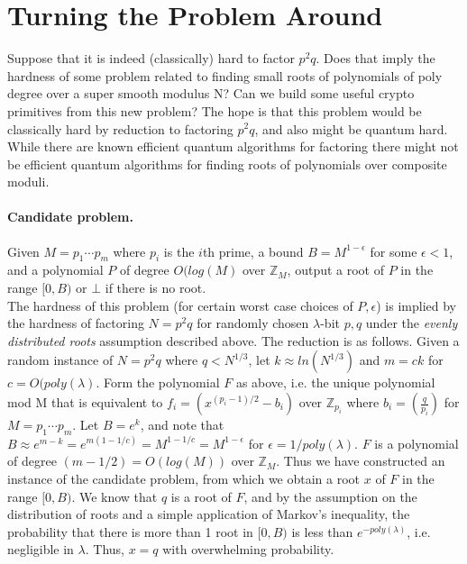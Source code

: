 \documentclass[letterpaper,twocolumn,10pt]{article}
\begin{document}

\section{Turning the Problem Around} 
Suppose that it is indeed (classically) hard to factor $p^2q$. Does that imply the hardness of some problem related to finding small roots of polynomials of poly degree over a super smooth modulus N? Can we build some useful crypto primitives from this new problem? The hope is that this problem would be classically hard by reduction to factoring $p^2 q$, and also might be quantum hard. While there are known efficient quantum algorithms for factoring there might not be efficient quantum algorithms for finding roots of polynomials over composite moduli. 

\paragraph{Candidate problem.} Given $M = p_1 \cdots p_m$ where $p_i$ is the $i$th prime, a bound $B = M^{1- \epsilon}$ for some $\epsilon < 1$, and a polynomial $P$ of degree $O(log(M)$ over $\mathbb{Z}_M$, output a root of $P$ in the range $[0, B)$ or $\bot$ if there is no root. \\

The hardness of this problem (for certain worst case choices of $P, \epsilon$) is implied by the hardness of factoring $N = p^2 q$ for randomly chosen $\lambda$-bit $p, q$ under the \emph{evenly distributed roots} assumption described above. The reduction is as follows. Given a random instance of $N = p^2 q$ where $q < N^{1/3}$, let $k \approx ln(N^{1/3})$ and $m = c k$ for $c = O(poly(\lambda)$. Form the polynomial $F$ as above, i.e. the unique polynomial mod M that is equivalent to $f_i = (x^{(p_i - 1)/2} - b_i)$ over $\mathbb{Z}_{p_i}$ where $b_i =  \left(\frac{q}{p_i}\right)$ for $M = p_1 \cdots p_m$. Let $B = e^k$, and note that $B \approx e^{m - k} = e^{m(1 - 1/c)} = M^{1 - 1/c} = M^{1- \epsilon}$ for $\epsilon = 1/poly(\lambda)$. $F$ is a polynomial of degree $(m - 1/2) = O(log(M))$ over $\mathbb{Z}_M$. Thus we have constructed an instance of the candidate problem, from which we obtain a root $x$ of $F$ in the range $[0, B)$. We know that $q$ is a root of $F$, and by the assumption on the distribution of roots and a simple application of Markov's inequality, the probability that there is more than 1 root in $[0, B)$ is less than $e^{-poly(\lambda)}$, i.e. negligible in $\lambda$. Thus, $x = q$ with overwhelming probability. 
\end{document}
